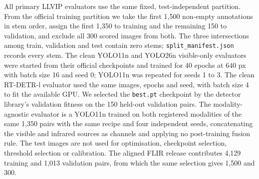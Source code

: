 \documentclass[10pt,a4paper]{article}
\begin{document}
All primary LLVIP evaluators use the same fixed, test-independent partition. From the
official training partition we take the first 1,500 non-empty annotations in stem order,
assign the first 1,350 to training and the remaining 150 to validation, and exclude all
300 scored images from both. The three intersections among train, validation and test
contain zero stems; \texttt{split\_manifest.json} records every stem. The clean
YOLO11n and YOLO26n visible-only evaluators were started from their official checkpoints
and trained for 40 epochs at $640$ px with batch size 16 and seed 0;
YOLO11n was repeated for seeds 1 to 3. The clean RT-DETR-l evaluator used the same
images, epochs and seed, with batch size 4 to fit the available GPU. We selected the
\texttt{best.pt} checkpoint by the detector library's validation fitness on the 150
held-out validation pairs. The modality-agnostic evaluator is a YOLO11n trained on both
registered modalities of the same 1,350 pairs with the same recipe and four independent
seeds, concatenating the visible and infrared sources as channels and applying no
post-training fusion rule. The test images are not used for optimisation, checkpoint
selection, threshold selection or calibration.
The aligned FLIR release contributes 4,129 training and 1,013 validation pairs, from
which the same selection gives 1,500 and 300.
\end{document}
